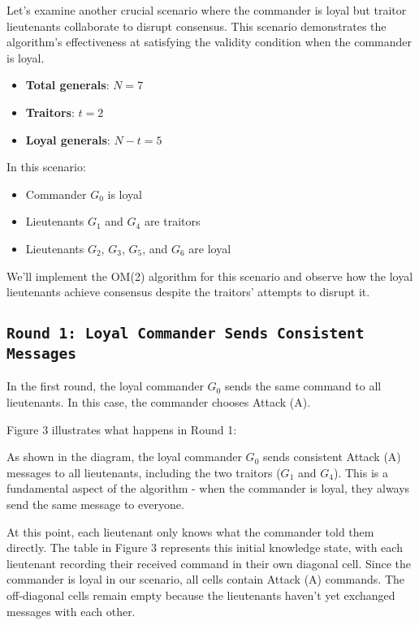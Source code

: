 \documentclass[11pt]{article}
\newcommand{\gen}[1]{\ensuremath{G_{#1}}}
\begin{document}
Let's examine another crucial scenario where the commander is loyal but traitor lieutenants collaborate to disrupt consensus. This scenario demonstrates the algorithm's effectiveness at satisfying the validity condition when the commander is loyal.

\begin{itemize}
    \item \textbf{Total generals}: $N = 7$
    \item \textbf{Traitors}: $t = 2$
    \item \textbf{Loyal generals}: $N - t = 5$
\end{itemize}

In this scenario:
\begin{itemize}
    \item Commander $\gen{0}$ is loyal
    \item Lieutenants $\gen{1}$ and $\gen{4}$ are traitors
    \item Lieutenants $\gen{2}$, $\gen{3}$, $\gen{5}$, and $\gen{6}$ are loyal
\end{itemize}

We'll implement the OM(2) algorithm for this scenario and observe how the loyal lieutenants achieve consensus despite the traitors' attempts to disrupt it.

\subsection*{\texttt{\large Round 1: Loyal Commander Sends Consistent Messages}}
In the first round, the loyal commander $\gen{0}$ sends the same command to all lieutenants. In this case, the commander chooses Attack (A).

Figure 3 illustrates what happens in Round 1:



As shown in the diagram, the loyal commander $\gen{0}$ sends consistent Attack (A) messages to all lieutenants, including the two traitors ($\gen{1}$ and $\gen{4}$). This is a fundamental aspect of the algorithm - when the commander is loyal, they always send the same message to everyone.

At this point, each lieutenant only knows what the commander told them directly. The table in Figure 3 represents this initial knowledge state, with each lieutenant recording their received command in their own diagonal cell. Since the commander is loyal in our scenario, all cells contain Attack (A) commands. The off-diagonal cells remain empty because the lieutenants haven't yet exchanged messages with each other.
\end{document}
